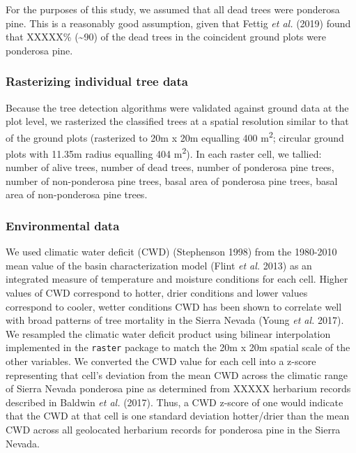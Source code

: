 \documentclass[]{article}
\begin{document}
For the purposes of this study, we assumed that all dead trees were
ponderosa pine. This is a reasonably good assumption, given that Fettig
\emph{et al.} (2019) found that XXXXX\% (\textasciitilde{}90) of the
dead trees in the coincident ground plots were ponderosa pine.

\subsubsection{Rasterizing individual tree
data}\label{rasterizing-individual-tree-data}

Because the tree detection algorithms were validated against ground data
at the plot level, we rasterized the classified trees at a spatial
resolution similar to that of the ground plots (rasterized to 20m x 20m
equalling 400 m\textsuperscript{2}; circular ground plots with 11.35m
radius equalling 404 m\textsuperscript{2}). In each raster cell, we
tallied: number of alive trees, number of dead trees, number of
ponderosa pine trees, number of non-ponderosa pine trees, basal area of
ponderosa pine trees, basal area of non-ponderosa pine trees.

\subsubsection{Environmental data}\label{environmental-data}

We used climatic water deficit (CWD) (Stephenson 1998) from the
1980-2010 mean value of the basin characterization model (Flint \emph{et
al.} 2013) as an integrated measure of temperature and moisture
conditions for each cell. Higher values of CWD correspond to hotter,
drier conditions and lower values correspond to cooler, wetter
conditions CWD has been shown to correlate well with broad patterns of
tree mortality in the Sierra Nevada (Young \emph{et al.} 2017). We
resampled the climatic water deficit product using bilinear
interpolation implemented in the \texttt{raster} package to match the
20m x 20m spatial scale of the other variables. We converted the CWD
value for each cell into a z-score representing that cell's deviation
from the mean CWD across the climatic range of Sierra Nevada ponderosa
pine as determined from XXXXX herbarium records described in Baldwin
\emph{et al.} (2017). Thus, a CWD z-score of one would indicate that the
CWD at that cell is one standard deviation hotter/drier than the mean
CWD across all geolocated herbarium records for ponderosa pine in the
Sierra Nevada.
\end{document}
